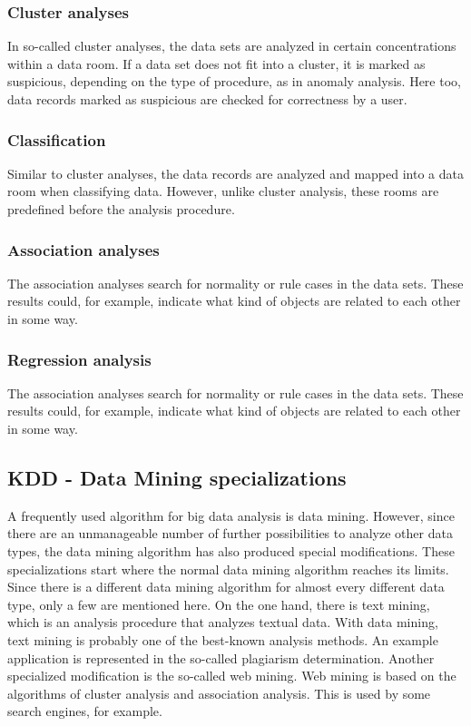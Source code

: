 \documentclass[12pt,twocolumn,twoside]{conference}   %
\begin{document}
\subsubsection{Cluster analyses}
In so-called cluster analyses, the data sets are analyzed in certain concentrations within a data room. If a data set does not fit into a cluster, it is marked as suspicious, depending on the type of procedure, as in anomaly analysis. Here too, data records marked as suspicious are checked for correctness by a user.

\subsubsection{Classification}
Similar to cluster analyses, the data records are analyzed and mapped into a data room when classifying data. However, unlike cluster analysis, these rooms are predefined before the analysis procedure. 

\subsubsection{Association analyses}
The association analyses search for normality or rule cases in the data sets. These results could, for example, indicate what kind of objects are related to each other in some way.

\subsubsection{Regression analysis}
The association analyses search for normality or rule cases in the data sets. These results could, for example, indicate what kind of objects are related to each other in some way. 

\subsection{KDD - Data Mining specializations}
A frequently used algorithm for big data analysis is data mining. However, since there are an unmanageable number of further possibilities to analyze other data types, the data mining algorithm has also produced special modifications. These specializations start where the normal data mining algorithm reaches its limits. Since there is a different data mining algorithm for almost every different data type, only a few are mentioned here. On the one hand, there is text mining, which is an analysis procedure that analyzes textual data. With data mining, text mining is probably one of the best-known analysis methods. An example application is represented in the so-called plagiarism determination. Another specialized modification is the so-called web mining. Web mining is based on the algorithms of cluster analysis and association analysis. This is used by some search engines, for example. 
\end{document}
